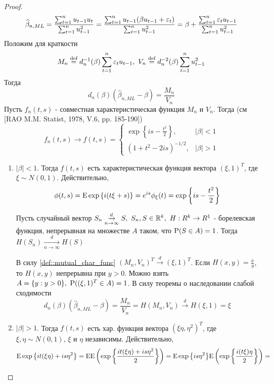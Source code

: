 \begin{proof}
    \[\widehat{\beta}_{n,ML}=\frac{\sum_{t=1}^nu_{t-1}u_t}{\sum_{t=1}^nu_{t-1}^2}=\frac{\sum_{t=1}^nu_{t-1}(\beta u_{t-1}+\eps_t)}{\sum_{t=1}^nu_{t-1}^2}=\beta+\frac{\sum_{t=1}^n\eps_tu_{t-1}}{\sum_{t=1}^nu_{t-1}^2}\]
    Положим для краткости
    \[M_n\defeq d^{-1}_n(\beta)\sum_{t=1}^n\eps_tu_{t-1},\ V_n\defeq d^{-2}_n(\beta)\sum_{t=1}^nu^2_{t-1}\]
    Тогда 
    \[d_n(\beta)(\widehat{\beta}_{n,ML}-\beta)=\frac{M_n}{V_n}\]
    Пусть $f_n(t,s)$ - совместная характеристическая функция $M_n$ и $V_n$.
    Тогда (см [RAO M.M. Statist, 1978, V.6, pp. 185-190])
    \begin{equation}\label{def::mutual_char_func}
        f_n(t,s)\rightarrow f(t,s)=\begin{cases}
            \exp{\left\{is-\frac{t^2}{2}\right\}},& \left\lvert \beta\right\rvert <1 \\
            (1+t^2-2is)^{-1/2},& \left\lvert \beta\right\rvert >1
        \end{cases}
    \end{equation}
    \begin{enumerate}
        \item \underline{$\left\lvert \beta\right\rvert <1$}. Тогда $f(t,s)$ есть характеристическая
        функция вектора $(\xi,1)^T$, где $\xi\sim N(0,1)$. Действительно,
        \[\phi(t,s)=\E\exp{\left\{i(t\xi+s)\right\}}=e^{is}\phi_\xi(t)=\exp{\left\{is-\frac{t^2}{2}\right\}}\]
        \begin{theorem*}
            Пусть случайный вектор $S_n\underset{n\rightarrow\infty}{\xrightarrow{d}}S,\ S_n,S\in\R^k,\ H:R^k\rightarrow R^1$ - 
            борелевская функция, непрерывная на множестве $A$ таком, что $\P(S\in A)=1$. Тогда $H(S_n)\underset{n\rightarrow\infty}{\xrightarrow{d}}H(S)$
        \end{theorem*}
        В силу \eqref{def::mutual_char_func} $(M_n,V_n)^T\xrightarrow{d}(\xi,1)^T$.
        Если $H(x,y)=\frac{x}{y}$, то $H(x,y)$  непрерывна при $y>0$.  Можно взять
        $A=\{y:y>0\},\ \P((\xi,1)^T\in A)=1$. В силу теоремы о наследовании
        слабой сходимости
        \[d_n(\beta)(\widehat{\beta}_{n,ML}-\beta)=\frac{M_n}{V_n}=H(M_n, V_n)\xrightarrow{d}H(\xi,1)=\xi\] 
        \item \underline{$\left\lvert \beta\right\rvert >1$}. Тогда $f(t,s)$ есть хар. функция 
        вектора $(\xi\eta,\eta^2)^T$, где $\xi,\eta\sim N(0,1)$, $\xi$ и $\eta$
        независимы. Действительно,
        \[\E\exp{\left\{it(\xi\eta)+is\eta^2\right\}}=\E\E\left(\exp{\left\{\frac{it(\xi\eta)+is\eta^2}{2}\right\}}\right)=\E\exp{\left\{is\eta^2\right\}}\E\left(\exp{\left\{\frac{i(t\xi)\eta}{2}\right\}}\right)=\]

\end{enumerate}
\end{proof}
